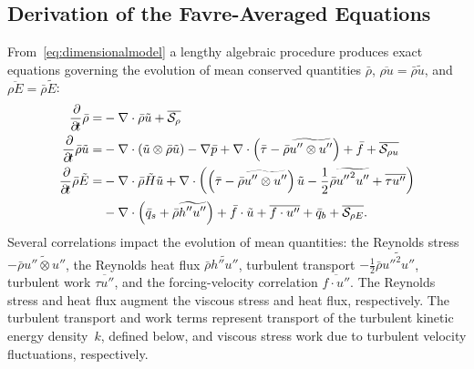 \subsection{Derivation of the Favre-Averaged Equations}
\label{sec:derivation_FANS}

From~\eqref{eq:dimensionalmodel} a lengthy algebraic procedure
\citep[\textsection{}2]{OliverFANSModels2011} produces exact equations governing
the evolution of mean conserved quantities
$\bar{\rho}$, $\overline{\rho{}u}= \bar{\rho}\tilde{u}$, and
$\overline{\rho{}E} = \bar{\rho}\tilde{E}$:
\begin{subequations}\label{eq:unclosedfansequations}
\begin{align}
    \frac{\partial\!}{\partial\!t}\bar{\rho}
 =
 &- \nabla\cdot\bar{\rho}\tilde{u}
  + \overline{\mathcal{S}_{\rho{}}}
\\
    \frac{\partial\!}{\partial\!t}\bar{\rho}\tilde{u}
 =
 &- \nabla\cdot(\tilde{u}\otimes\bar{\rho}\tilde{u})
  - \nabla{}\bar{p}
  + \nabla\cdot\left(
        \bar{\tau}
      - \bar{\rho}\widetilde{u''\otimes{}u''}
    \right)
  + \bar{f}
  + \overline{\mathcal{S}_{\rho{} u}}
\\
  \frac{\partial\!}{\partial\!t} \bar{\rho}\tilde{E}
 =
 &- \nabla\cdot{}\bar{\rho}\tilde{H}\tilde{u}
  + \nabla\cdot\left(
        \left(
            \bar{\tau}
          - \bar{\rho} \widetilde{u''\otimes{}u''}
        \right) \tilde{u}
      - \frac{1}{2}\bar{\rho}\widetilde{{u''}^{2}u''}
      + \overline{\tau{}u''}
    \right)
\notag\\
 &- \nabla\cdot\left(
        \bar{q}_s
      + \bar{\rho} \widetilde{h''u''}
    \right)
  + \bar{f}\cdot\tilde{u}
  + \overline{f\cdot{}u''}
  + \bar{q}_{b}
  + \overline{\mathcal{S}_{\rho{} E}}.
\end{align}
\end{subequations}
Several correlations impact the evolution of mean quantities: the Reynolds
stress $-\bar{\rho}\widetilde{u''\otimes{}u''}$, the Reynolds heat flux
$\bar{\rho} \widetilde{h''u''}$, turbulent transport
$-\frac{1}{2}\bar{\rho}\widetilde{{u''}^{2}u''}$, turbulent work
$\overline{\tau{}u''}$, and the forcing-velocity correlation
$\overline{f\cdot{}u''}$.  The Reynolds stress and heat flux augment the
viscous stress and heat flux, respectively.  The turbulent transport and work
terms represent transport of the turbulent kinetic energy density~$k$, defined
below, and viscous stress work due to turbulent velocity fluctuations,
respectively.

